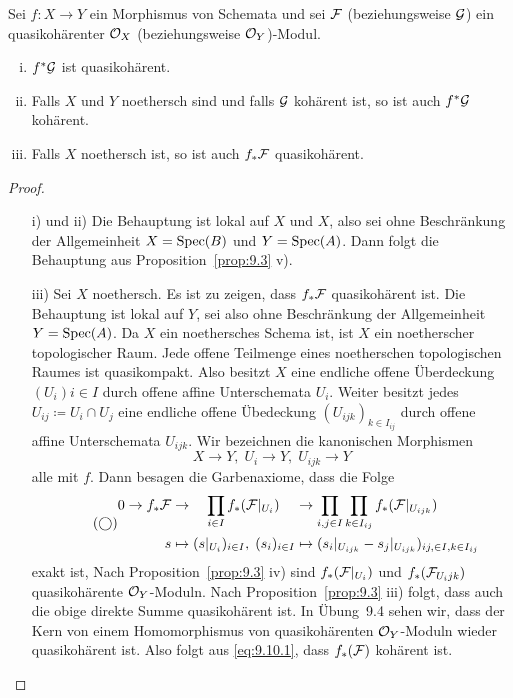 \begin{prop}
\label{prop:9.10}
	Sei $f\colon X \to Y$ ein Morphismus von Schemata und sei $\mathcal{F}$ (beziehungsweise $\mathcal{G}$) ein quasikohärenter $\mathcal{O}_X$ (beziehungsweise $\mathcal{O}_Y$)-Modul.
	\begin{enumerate}[i)]
		\item $f^*\mathcal{G}$ ist quasikohärent.
		\item Falls $X$ und $Y$ noethersch sind und falls $\mathcal{G}$ kohärent ist, so ist auch $f^*\mathcal{G}$ kohärent.
		\item Falls $X$ noethersch ist, so ist auch $f_*\mathcal{F}$ quasikohärent.
	\end{enumerate}
	\begin{proof}\hfill\\
		\begin{itemize}
			\item[i) und ii)] Die Behauptung ist lokal auf $X$ und $X$, also sei ohne Beschränkung der Allgemeinheit $X=\operatorname{Spec}(B)$ und $Y=\operatorname{Spec}(A)$. Dann folgt die Behauptung aus Proposition~\ref{prop:9.3} v).
			\item[iii)] Sei $X$ noethersch. Es ist zu zeigen, dass $f_*\mathcal{F}$ quasikohärent ist. Die Behauptung ist lokal auf $Y$, sei also ohne Beschränkung der Allgemeinheit $Y=\operatorname{Spec}(A)$. Da $X$ ein noethersches Schema ist, ist $X$ ein noetherscher topologischer Raum. Jede offene Teilmenge eines noetherschen topologischen Raumes ist quasikompakt. Also besitzt $X$ eine endliche offene Überdeckung $(U_i){i\in I}$ durch offene affine Unterschemata $U_i$. Weiter besitzt jedes $U_{ij}\coloneqq U_i \cap U_j$ eine endliche offene Übedeckung $(U_{ijk})_{k\in I_{ij}}$ durch offene affine Unterschemata $U_{ijk}$. Wir bezeichnen die kanonischen Morphismen
			\[
			 	X \to Y,\; U_i\to Y,\;U_{ijk}\to Y
			\]
			alle mit $f$. Dann besagen die Garbenaxiome, dass die Folge
			\begin{equation*}
			\label{eq:9.10.1}\tag{$\bigcirc$}
				\begin{alignedat}{3}
					0 \to f_*\mathcal{F} &\to \quad\prod_{i\in I}f_*(\mathcal{F}\vert_{U_i}) &&\to \prod_{i,j\in I}\prod_{k \in I_{ij}}f_*(\mathcal{F}\vert_{U_{ijk}})\\
					s &\mapsto (s\vert_{U_i})_{i\in I},\; (s_i)_{i\in I} &&\mapsto (s_i\vert_{U_{ijk}}-s_j\vert_{U_{ijk}})_{ij,\in I, k \in I_{ij}}
				\end{alignedat}
			\end{equation*}
			exakt ist, Nach Proposition~\ref{prop:9.3} iv) sind $f_*(\mathcal{F}\vert_{U_i})$ und $f_*(\mathcal{F}_{U_ijk})$ quasikohärente $\mathcal{O}_Y$-Moduln. Nach Proposition~\ref{prop:9.3} iii) folgt, dass auch die obige direkte Summe quasikohärent ist. In Übung~9.4 sehen wir, dass der Kern von einem Homomorphismus von quasikohärenten $\mathcal{O}_Y$-Moduln wieder quasikohärent ist. Also folgt aus \eqref{eq:9.10.1}, dass $f_*(\mathcal{F})$ kohärent ist.
		\end{itemize}
	\end{proof}
\end{prop}

